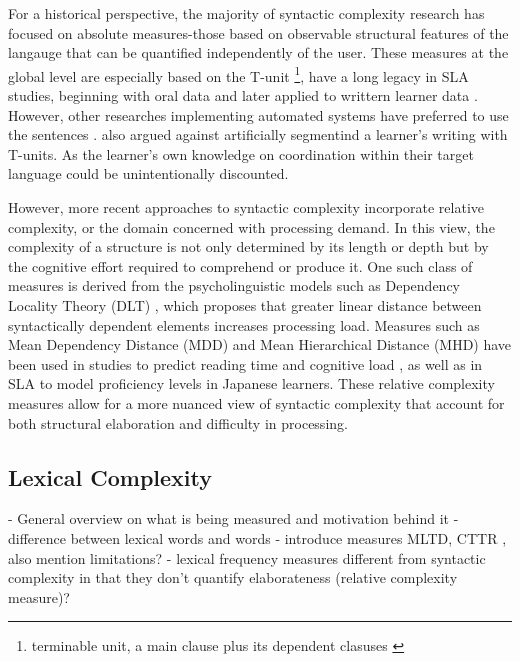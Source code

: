 For a historical perspective, the majority of syntactic complexity research has focused on absolute measures-those 
based on observable structural features of the langauge that can be quantified independently of the user. These 
measures at the global level are especially based on the T-unit
\footnote{terminable unit, a main clause plus its dependent clasuses
\cite{hunt1965}}, have a long legacy in SLA studies, beginning with oral data \cite{hunt1965} and later applied to
writtern learner data \cite{Ortega2003,Lu2011}. However, other researches implementing automated systems have
preferred to use the sentences \cite{Vyatkina2012,Lu2010}. \citet{Bardovi-Harlig1992} also argued against
artificially segmentind a learner's writing with T-units. As the learner's own knowledge on coordination within
their target language could be unintentionally discounted.

However, more recent approaches to syntactic complexity incorporate relative complexity, or the domain concerned
with processing demand. In this view, the complexity of a structure is not only determined by its length or depth
but by the cognitive effort required to comprehend or produce it. One such class of measures is derived from the 
psycholinguistic models such as Dependency Locality Theory (DLT) \cite{Gibson2000}, which proposes that greater linear distance 
between syntactically dependent elements increases processing load. Measures such as Mean Dependency Distance (MDD)\cite{Liu2008} and Mean Hierarchical Distance (MHD) \cite{Liu2017} have been used in studies to predict reading time and cognitive load \cite{shain2016, Feng2009}, as well as in SLA to model proficiency levels in Japanese learners\cite{Jiang2019,komori2019,Yang2023}. These relative complexity measures allow for a more nuanced view of syntactic complexity that account for both structural elaboration and difficulty in processing. %






\subsection{Lexical Complexity}
- General overview on what is being measured and motivation behind it
    -difference between lexical words and words
- introduce measures MLTD, CTTR , also mention limitations?
- lexical frequency measures different from syntactic complexity in that they don't quantify elaborateness (relative
complexity measure)?


